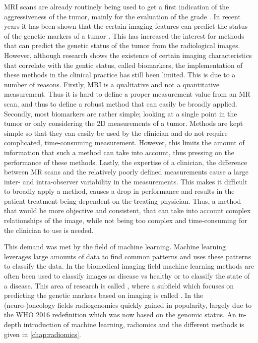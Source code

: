 \gls{MRI} scans are already routinely being used to get a first indication of the aggressiveness of the tumor, mainly for the evaluation of the grade \autocite{upadhyay2011MRIevaluation}.
In recent years it has been shown that the certain imaging features can predict the status of the genetic markers of a tumor \autocite{patel2017mismatch, smits2016imaging}.
This has increased the interest for methods that can predict the genetic status of the tumor from the radiological images.
However, although research shows the existence of certain imaging characteristics that correlate with the gentic status, called biomarkers, the implementation of these methods in the clinical practice has still been limited.
This is due to a number of reasons.
Firstly, \gls{MRI} is a qualitative and not a quantitative measurement.
Thus it is hard to define a proper measurement value from an \gls{MR} scan, and thus to define a robust method that can easily be broadly applied.
Secondly, most biomarkers are rather simple; looking at a single point in the tumor or only considering the 2D measurements of a tumor.
Methods are kept simple so that they can easily be used by the clinician and do not require complicated, time-consuming measurement.
However, this limits the amount of information that such a method can take into account, thus pressing on the performance of these methods.
Lastly, the expertise of a clinician, the difference between \gls{MR} scans and the relatively poorly defined measurements cause a large inter- and intra-observer variability in the measurements.
This makes it difficult to broadly apply a method, causes a drop in performance and results in the patient treatment being dependent on the treating physician.
Thus, a method that would be more objective and consistent, that can take into account complex relationships of the image, while not being too complex and time-consuming for the clinician to use is needed.

This demand was met by the field of machine learning.
Machine learning leverages large amounts of data to find common patterns and uses these patterns to classify the data.
In the biomedical imaging field machine learning methods are often been used to classify images as disease vs healthy or to classify the state of a disease.
This area of research is called , where a subfield which focuses on predicting the genetic markers based on imaging is called .
In the (neuro-)oncology fields radiogenomics quickly gained in popularity, largely due to the WHO 2016 redefinition which was now based on the genomic status.
An in-depth introduction of machine learning, radiomics and the different methods is given in \cref{chap:radiomics}.

